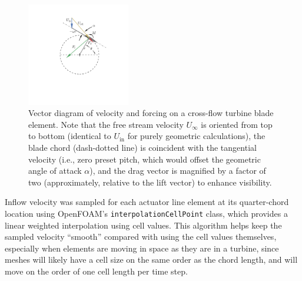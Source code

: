 \documentclass[times]{weauth}
\begin{document}

\begin{figure}
    \centering

    \includegraphics[clip, trim=1in 1.5in 1in 0.5in,
    width=0.4\textwidth]{figures/CFT-vectors_cft-vectors}

    \caption{Vector diagram of velocity and forcing on a cross-flow turbine
    blade element. Note that the free stream velocity $U_\infty$ is oriented
    from top to bottom (identical to $U_{\mathrm{in}}$ for purely geometric
    calculations), the blade chord (dash-dotted line) is coincident with the
    tangential velocity (i.e., zero preset pitch, which would offset the
    geometric angle of attack $\alpha$), and the drag vector is magnified by a
    factor of two (approximately, relative to the lift vector) to enhance
    visibility.}

    \label{fig:vectors}
\end{figure}


Inflow velocity was sampled for each actuator line element at its quarter-chord
location using OpenFOAM's \texttt{interpolationCellPoint} class, which provides
a linear weighted interpolation using cell values. This algorithm helps keep the
sampled velocity ``smooth'' compared with using the cell values themselves,
especially when elements are moving in space as they are in a turbine, since
meshes will likely have a cell size on the same order as the chord length, and
will move on the order of one cell length per time step.
\end{document}

